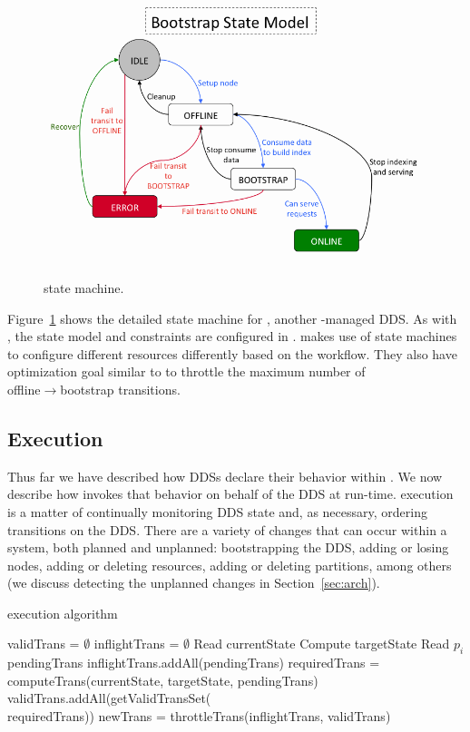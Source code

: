 \begin{figure}[t]
    {\includegraphics[width=\columnwidth]{bootstrap_statemodel.png}}
    \vspace*{-2ex}
    \caption{\label{fig:bootstrap_statemodel} \seas state machine.}
\end{figure}

Figure~\ref{fig:bootstrap_statemodel} shows the detailed state machine for \seas, another
\helix-managed DDS. As with \\ \ES, the state model and
constraints are configured in \helix. \seas makes use of state machines to
configure different resources differently based on the workflow. They also have
optimization goal similar to \ES to throttle the maximum number of \\
offline$\rightarrow$bootstrap transitions. 

\subsection{\helix Execution}
%
Thus far we have described how DDSs declare their behavior within \helix.  We
now describe how \helix invokes that behavior on behalf of the DDS at run-time.  
\helix execution is a matter of continually monitoring DDS state and, as
necessary, ordering transitions on the DDS.   There are a variety of changes 
that can occur within a system, both planned and unplanned: bootstrapping the
DDS, adding or losing nodes, adding or deleting resources, adding or deleting
partitions, among others (we discuss detecting the unplanned changes in
Section~\ref{sec:arch}).

\begin{algorithm}
\label{alg:execution}
\caption{\helix execution algorithm}
\begin{algorithmic}[1]
\REPEAT
\STATE validTrans = $\emptyset$
\STATE inflightTrans = $\emptyset$
  \STATE Read currentState
  \STATE Compute targetState 
  \STATE Read $p_i$ pendingTrans
  \STATE inflightTrans.addAll(pendingTrans)
  \STATE requiredTrans = computeTrans(currentState, targetState, 
pendingTrans) 
  \STATE validTrans.addAll(getValidTransSet( \\ requiredTrans))
\ENDFOR
\STATE newTrans = throttleTrans(inflightTrans, validTrans) 
\end{algorithmic}
\end{algorithm}

